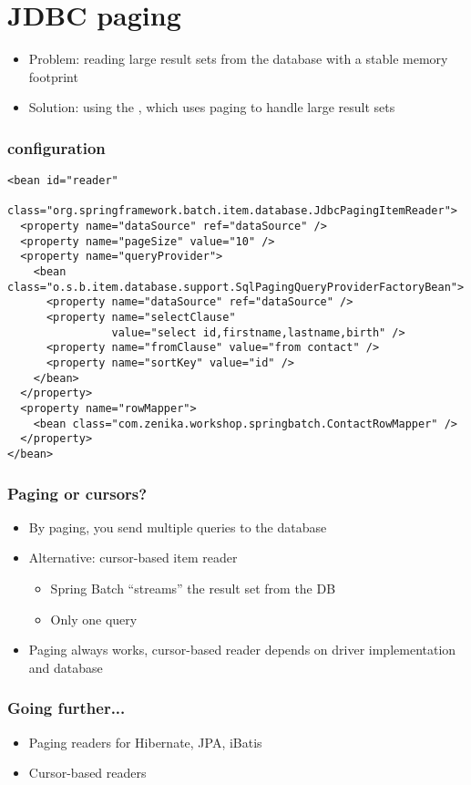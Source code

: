 \section{JDBC paging}

\begin{frame}
 \begin{itemize}
  \item Problem: reading large result sets from the database with a stable memory footprint 
  \item Solution: using the , which uses paging to handle large result sets
 \end{itemize}
\end{frame}


\begin{frame}[fragile]
\frametitle{ configuration}

\lstset{language=XML}
\begin{lstlisting}
<bean id="reader"
      class="org.springframework.batch.item.database.JdbcPagingItemReader">
  <property name="dataSource" ref="dataSource" />
  <property name="pageSize" value="10" />
  <property name="queryProvider">
    <bean class="o.s.b.item.database.support.SqlPagingQueryProviderFactoryBean">
      <property name="dataSource" ref="dataSource" />
      <property name="selectClause" 
                value="select id,firstname,lastname,birth" />
      <property name="fromClause" value="from contact" />
      <property name="sortKey" value="id" />
    </bean>
  </property>
  <property name="rowMapper">
    <bean class="com.zenika.workshop.springbatch.ContactRowMapper" />
  </property>
</bean>
\end{lstlisting}
\end{frame}

\begin{frame}
\frametitle{Paging or cursors?}
\begin{itemize}
 \item By paging, you send multiple queries to the database
 \item Alternative: cursor-based item reader
 \begin{itemize}
  \item Spring Batch “streams” the result set from the DB
  \item Only one query
 \end{itemize}
 \item Paging always works, cursor-based reader depends on driver implementation and database
\end{itemize}
\end{frame}

\begin{frame}
 \frametitle{Going further...}
 \begin{itemize}
  \item Paging readers for Hibernate, JPA, iBatis
  \item Cursor-based readers
 \end{itemize}
\end{frame}

